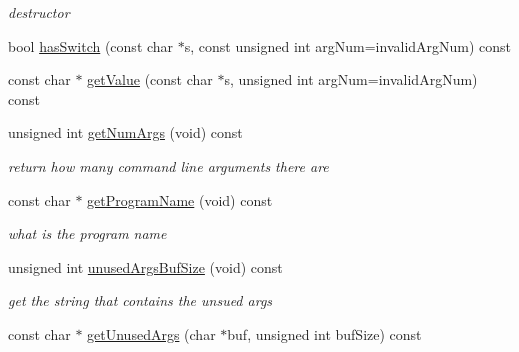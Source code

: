 \begin{DoxyCompactItemize}
\begin{DoxyCompactList}\small\item\em destructor \item\end{DoxyCompactList}\item 
bool \hyperlink{classFramework_1_1SampleCommandLine_ae49e4180a596d53ef291243ee9c77aed}{hasSwitch} (const char $\ast$s, const unsigned int argNum=invalidArgNum) const 
\item 
const char $\ast$ \hyperlink{classFramework_1_1SampleCommandLine_ae594ca031cedf3693eef6ba3ca1c5f04}{getValue} (const char $\ast$s, unsigned int argNum=invalidArgNum) const 
\item 
\hypertarget{classFramework_1_1SampleCommandLine_a90bf6af8621b98c69f9bab3e36fc8556}{
unsigned int \hyperlink{classFramework_1_1SampleCommandLine_a90bf6af8621b98c69f9bab3e36fc8556}{getNumArgs} (void) const }
\label{classFramework_1_1SampleCommandLine_a90bf6af8621b98c69f9bab3e36fc8556}

\begin{DoxyCompactList}\small\item\em return how many command line arguments there are \item\end{DoxyCompactList}\item 
\hypertarget{classFramework_1_1SampleCommandLine_a0cbe42e047c5288bd8216b3a08f4562c}{
const char $\ast$ \hyperlink{classFramework_1_1SampleCommandLine_a0cbe42e047c5288bd8216b3a08f4562c}{getProgramName} (void) const }
\label{classFramework_1_1SampleCommandLine_a0cbe42e047c5288bd8216b3a08f4562c}

\begin{DoxyCompactList}\small\item\em what is the program name \item\end{DoxyCompactList}\item 
\hypertarget{classFramework_1_1SampleCommandLine_ab7c97bee798caf333a384df94b0e0574}{
unsigned int \hyperlink{classFramework_1_1SampleCommandLine_ab7c97bee798caf333a384df94b0e0574}{unusedArgsBufSize} (void) const }
\label{classFramework_1_1SampleCommandLine_ab7c97bee798caf333a384df94b0e0574}

\begin{DoxyCompactList}\small\item\em get the string that contains the unsued args \item\end{DoxyCompactList}\item 
\hypertarget{classFramework_1_1SampleCommandLine_a3a2d5e91756e53b04648314f30d75548}{
const char $\ast$ \hyperlink{classFramework_1_1SampleCommandLine_a3a2d5e91756e53b04648314f30d75548}{getUnusedArgs} (char $\ast$buf, unsigned int bufSize) const }
\label{classFramework_1_1SampleCommandLine_a3a2d5e91756e53b04648314f30d75548}


\end{DoxyCompactItemize}
